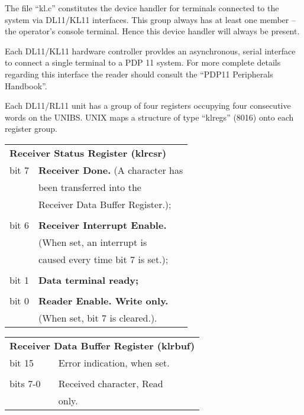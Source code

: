 
The file ``kl.c'' constitutes the device
handler for terminals connected to the
system via DL11/KL11 interfaces. This
group always has at least one member -- the operator's console terminal. Hence
this device handler will always be
present.

Each DL11/KL11 hardware controller provldes an asynchronous, serial interface
to connect a single terminal to a PDP
11 system. For more complete details
regarding this interface the reader
should consult the ``PDP11 Peripherals
Handbook''.


Each DL11/RL11 unit has a group of four
registers occupying four consecutive
words on the UNIBS. UNIX maps a
structure of type ``klregs'' (8016) onto
each register group.

\noindent\begin{tabular}{ll}\\
\multicolumn{2}{l}{\bf Receiver Status Register (klrcsr)} \\
bit 7 & {\bf Receiver Done.} (A character has\\
      & been transferred into the\\
      & Receiver Data Buffer Register.);\\
\\
bit 6 & {\bf Receiver Interrupt Enable.}\\
      & (When set, an interrupt is\\
      & caused every time bit 7 is set.);\\
\\
bit 1 & {\bf Data terminal ready;}\\
\\
bit 0 & {\bf Reader Enable. Write only.}\\
      & (When set, bit 7 is cleared.).\\
\end{tabular}

\noindent\begin{tabular}{ll}\\
\multicolumn{2}{l}{\bf Receiver Data Buffer Register (klrbuf)} \\
bit 15 & Error indication, when set.\\
\\
bits 7-0 & Received character, Read\\
         & only.\\
\end{tabular}

